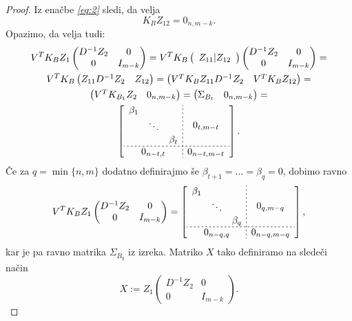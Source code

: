 \documentclass[mat1]{article}
\begin{document}
\begin{proof}
Iz enačbe \textit{\eqref{eq:2}} sledi, da velja
$$
K_B Z_{12} = 0_{n, m-k} \text{.}
$$
Opazimo, da velja tudi:
\begin{gather*}
V^T K_B Z_1
\begin{pmatrix}
D^{-1} Z_2 & 0\\ 
0 & I_{m-k}
\end{pmatrix} = 
V^T K_B \left(\begin{array}{c} Z_{11} | Z_{12} \end{array}\right)
\begin{pmatrix}
D^{-1} Z_2 & 0\\ 
0 & I_{m-k}
\end{pmatrix} = \\
V^T K_B
\begin{pmatrix}
 Z_{11} D^{-1} Z_2 & Z_{12} 
\end{pmatrix} =
\begin{pmatrix}
V^T K_B Z_{11} D^{-1} Z_2 & V^T K_B Z_{12} 
\end{pmatrix} = \\
\begin{pmatrix}
V^T K_{B_1} Z_2 & 0_{n, m-k} 
\end{pmatrix} =
\begin{pmatrix}
\Sigma_{B_t} & 0_{n, m-k} 
\end{pmatrix} = \\
\left[
\begin{array}{c;{2pt/2pt}c}
\begin{matrix}
\beta_1 & & \\
 & \ddots & \\
 & & \beta_t
\end{matrix} & 0_{t, m - t}
 \\ \hdashline[2pt/2pt]
0_{n-t, t} & 0_{n-t, m-t}
\end{array} \right]
\text{.}
\end{gather*}
Če za $q = \min\{n,m\}$ dodatno definirajmo še $\beta_{t+1} = \ldots = \beta_{q} = 0$, dobimo ravno
\begin{gather*}
V^T K_B Z_1
\begin{pmatrix}
D^{-1} Z_2 & 0\\ 
0 & I_{m-k}
\end{pmatrix} = 
\left[
\begin{array}{c;{2pt/2pt}c}
\begin{matrix}
\beta_1 & & \\
 & \ddots & \\
 & & \beta_q
\end{matrix} & 0_{q, m - q}
 \\ \hdashline[2pt/2pt]
0_{n-q, q} & 0_{n-q, m-q}
\end{array} \right]
\text{,}
\end{gather*}
kar je pa ravno matrika $\Sigma_{B_q}$ iz izreka. Matriko $X$ tako definiramo na sledeči način
$$ X := Z_1 
\begin{pmatrix}
D^{-1} Z_2 & 0\\ 
0 & I_{m-k}
\end{pmatrix}
\text{.}$$


\end{proof}
\end{document}

